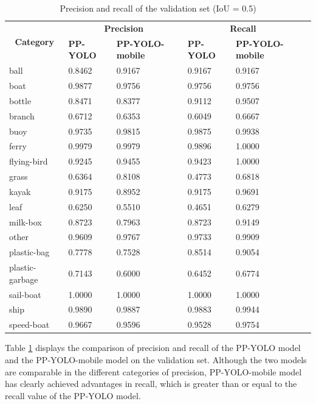 \documentclass[journal,article,submit,moreauthors,pdftex]{Definitions/mdpi}
\begin{document}
\begin{table}[htbp]
\centering
\caption{Precision and recall of the validation set (IoU = 0.5)}
\begin{tabular}{llllll} 
\toprule

\multicolumn{1}{c}{\multirow{2}{*}{\textbf{Category}}} & \multicolumn{2}{c}{\textbf{Precision}}       & \multicolumn{2}{c}{\textbf{Recall}} \\
\cmidrule(l){2-5} 
\multicolumn{1}{c}{} & \textbf{PP-YOLO} & \textbf{PP-YOLO-mobile} & \textbf{PP-YOLO} & \textbf{PP-YOLO-mobile} \\

\midrule
ball& 0.8462& 0.9167& 0.9167& 0.9167 \\
boat& 0.9877& 0.9756& 0.9756& 0.9756 \\
bottle& 0.8471& 0.8377& 0.9112& 0.9507 \\
branch& 0.6712& 0.6353& 0.6049& 0.6667 \\
buoy& 0.9735& 0.9815& 0.9875& 0.9938 \\
ferry& 0.9979& 0.9979& 0.9896& 1.0000 \\
flying-bird& 0.9245&0.9455 & 0.9423& 1.0000 \\
grass& 0.6364& 0.8108& 0.4773& 0.6818 \\
kayak& 0.9175& 0.8952& 0.9175& 0.9691 \\
leaf& 0.6250& 0.5510& 0.4651& 0.6279 \\
milk-box& 0.8723& 0.7963& 0.8723& 0.9149 \\
other& 0.9609& 0.9767& 0.9733& 0.9909 \\
plastic-bag& 0.7778& 0.7528& 0.8514& 0.9054 \\
plastic-garbage& 0.7143&0.6000 & 0.6452& 0.6774 \\
sail-boat& 1.0000& 1.0000& 1.0000& 1.0000 \\
ship& 0.9890& 0.9887& 0.9883& 0.9944 \\
speed-boat& 0.9667& 0.9596& 0.9528& 0.9754 \\

\bottomrule
\end{tabular}
\label{tbl:precision}
\end{table}

Table \ref{tbl:precision} displays the comparison of precision and recall of the PP-YOLO model and the PP-YOLO-mobile model on the validation set. Although the two models are comparable in the different categories of precision, PP-YOLO-mobile model has clearly achieved advantages in recall, which is greater than or equal to the recall value of the PP-YOLO model.
\end{document}
